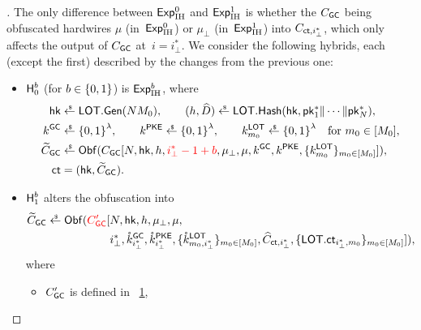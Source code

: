 \begin{proof}[]
The only difference between $\ExpIH{0}$ and $\ExpIH{1}$ is whether the $C_\GC$ being obfuscated hardwires $\mu$ (in~$\ExpIH{0}$) or $\mu_\bot$ (in~$\ExpIH{1}$) into $C_{\ct,i_\bot^\ast}$, which only affects the output of $C_\GC$ at~${i=i_\bot^\ast}$.
We consider the following hybrids, each (except the first) described by the changes from the previous one:
\begin{itemize}
\item $\Hyb_0^b$ (for ${b\in{\{0,1\}}}$) is $\ExpIH{b}$, where
\begin{align*}
\hk&{}\draws\LOT.\Gen(NM_0),\qquad
(h,\widehat{D})\draws\LOT.\Hash(\hk,\pk^\ast_1\concat\cdots\concat\pk^\ast_N),\\
k^\GC&{}\draws\bit^\lambda,\qquad
k^\PKE\draws\bit^\lambda,\qquad
k^\LOT_{m_0}\draws\bit^\lambda\quad\textup{for }m_0\in[M_0],\\
\widetilde{C}_\GC&{}\draws\Obf(C_\GC[
N,\hk,h,{\color{red}i_\bot^\ast-1+b},\mu_\bot,\mu,k^\GC,k^\PKE,\{k^\LOT_{m_0}\}_{m_0\in[M_0]}
]),\\
\ct&{}=(\hk,\widetilde{C}_\GC).
\end{align*}
\item $\Hyb_1^b$ alters the obfuscation into
\begin{align*}
\WideNarrow{}{\hspace*{-1.5em}}
\widetilde{C}_\GC\draws\Obf({\color{red}C_\GC'}[
{}&
N,\hk,h,\mu_\bot,\mu,
\\ &
i_\bot^\ast,
\mathring{k}^\GC_{i_\bot^\ast},
\mathring{k}^\PKE_{i_\bot^\ast},
\{\mathring{k}^\LOT_{m_0,i_\bot^\ast}\}_{m_0\in[M_0]},
\widehat{C}_{\ct,i_\bot^\ast},
\{\LOT.\ct_{i_\bot^\ast,m_0}\}_{m_0\in[M_0]}
]),
\end{align*}
where
\begin{itemize}
\item $C_\GC'$ is defined in \Figure~\ref{fig:circuit-create-gc-proof},

\begin{figure}[!b]

\label{fig:circuit-create-gc-proof}
\end{figure}


\end{itemize}
\end{itemize}
\end{proof}
